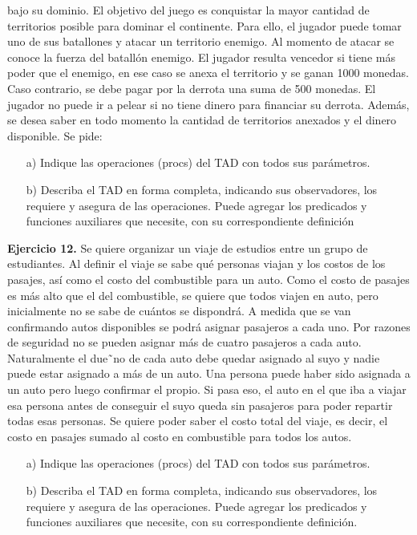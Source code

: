 \documentclass{article}
\begin{document}
bajo su dominio. El objetivo del juego es conquistar la mayor cantidad de territorios posible para dominar el continente.
Para ello, el jugador puede tomar uno de sus batallones y atacar un territorio enemigo. Al momento de atacar se conoce la
fuerza del batall\'on enemigo. El jugador resulta vencedor si tiene m\'as poder que el enemigo, en ese caso se anexa el territorio
y se ganan 1000 monedas. Caso contrario, se debe pagar por la derrota una suma de 500 monedas. El jugador no puede ir a
pelear si no tiene dinero para financiar su derrota.
Adem\'as, se desea saber en todo momento la cantidad de territorios anexados y el dinero disponible.
Se pide:
\begin{itemize}
    \item[a)] Indique las operaciones (procs) del TAD con todos sus par\'ametros.
    \item[b)] Describa el TAD en forma completa, indicando sus observadores, los requiere y asegura de las operaciones. Puede agregar
    los predicados y funciones auxiliares que necesite, con su correspondiente definici\'on
\end{itemize}
\textbf{Ejercicio 12.} Se quiere organizar un viaje de estudios entre un grupo de estudiantes. Al definir el viaje se sabe qu\'e personas
viajan y los costos de los pasajes, as\'i como el costo del combustible para un auto. Como el costo de pasajes es m\'as alto que
el del combustible, se quiere que todos viajen en auto, pero inicialmente no se sabe de cu\'antos se dispondr\'a.
A medida que se van confirmando autos disponibles se podr\'a asignar pasajeros a cada uno. Por razones de seguridad no
se pueden asignar m\'as de cuatro pasajeros a cada auto. Naturalmente el due˜no de cada auto debe quedar asignado al suyo
y nadie puede estar asignado a m\'as de un auto. Una persona puede haber sido asignada a un auto pero luego confirmar el
propio. Si pasa eso, el auto en el que iba a viajar esa persona antes de conseguir el suyo queda sin pasajeros para poder
repartir todas esas personas.
Se quiere poder saber el costo total del viaje, es decir, el costo en pasajes sumado al costo en combustible para todos los
autos.
\begin{itemize}
    \item[a)] Indique las operaciones (procs) del TAD con todos sus par\'ametros.
    \item[b)] Describa el TAD en forma completa, indicando sus observadores, los requiere y asegura de las operaciones. Puede agregar los predicados y funciones auxiliares que necesite, con su correspondiente definici\'on.
\end{itemize}
\end{document}
